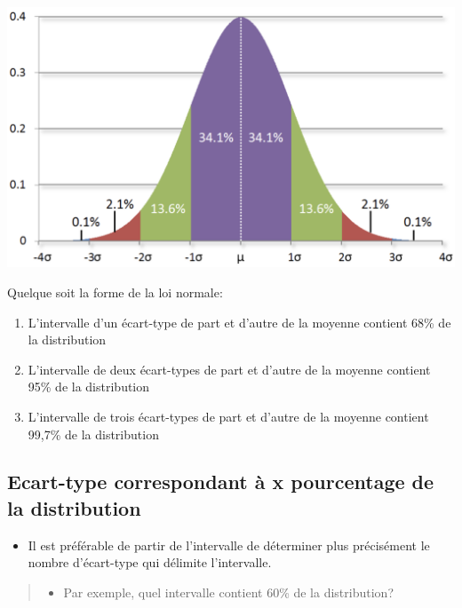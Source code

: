 \documentclass[
]{article}
\providecommand{\tightlist}{%
  \setlength{\itemsep}{0pt}\setlength{\parskip}{0pt}}
\begin{document}
\includegraphics{../Images/Courbe_normale.png}

Quelque soit la forme de la loi normale:

\begin{enumerate}
\def\labelenumi{\arabic{enumi}.}
\item
  L'intervalle d'un écart-type de part et d'autre de la moyenne contient
  68\% de la distribution
\item
  L'intervalle de deux écart-types de part et d'autre de la moyenne
  contient 95\% de la distribution
\item
  L'intervalle de trois écart-types de part et d'autre de la moyenne
  contient 99,7\% de la distribution
\end{enumerate}

\hypertarget{ecart-type-correspondant-uxe0-x-pourcentage-de-la-distribution}{%
\subsection{Ecart-type correspondant à x pourcentage de la
distribution}\label{ecart-type-correspondant-uxe0-x-pourcentage-de-la-distribution}}

\begin{itemize}
\tightlist
\item
  Il est préférable de partir de l'intervalle de déterminer plus
  précisément le nombre d'écart-type qui délimite l'intervalle.
\end{itemize}

\begin{quote}
\begin{itemize}
\tightlist
\item
  Par exemple, quel intervalle contient 60\% de la distribution?
\end{itemize}
\end{quote}
\end{document}
